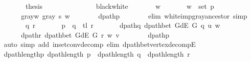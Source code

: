 \begin{isabellebody}
\ \ \ \ \isamarkupfalse%
\ \isamarkupfalse%
\ {\isacharquery}{\kern0pt}thesis\isanewline
\ \ \ \ \ \ \isacommand{{\isachardot}{\kern0pt}}\isamarkupfalse%
\isanewline
\ \ \isamarkupfalse%
\isanewline
\ \ \ \ \isamarkupfalse%
\ black{\isacharunderscore}{\kern0pt}white\isanewline
\ \ \ \ \isamarkupfalse%
\ \isamarkupfalse%
\ w\ \isanewline
\ \ \ \ \ \ {\isachardoublequoteopen}w\ {\isasymin}\ set\ p{\isachardoublequoteclose}\ \isanewline
\ \ \ \ \ \ gray{\isacharunderscore}{\kern0pt}w{\isacharcolon}{\kern0pt}\ {\isachardoublequoteopen}gray\ s\ w{\isachardoublequoteclose}\isanewline
\ \ \ \ \ \ \isamarkupfalse%
\ dpath{\isacharunderscore}{\kern0pt}p\isanewline
\ \ \ \ \ \ \isamarkupfalse%
\ {\isacharparenleft}{\kern0pt}elim\ white{\isacharunderscore}{\kern0pt}imp{\isacharunderscore}{\kern0pt}gray{\isacharunderscore}{\kern0pt}ancestor{\isacharparenright}{\kern0pt}\ simp{\isacharplus}{\kern0pt}\isanewline
\ \ \ \ \isamarkupfalse%
\ \isamarkupfalse%
\ q\ r\ \isanewline
\ \ \ \ \ \ {\isachardoublequoteopen}p\ {\isacharequal}{\kern0pt}\ q\ {\isacharat}{\kern0pt}\ tl\ r{\isachardoublequoteclose}\ \isanewline
\ \ \ \ \ \ dpath{\isacharunderscore}{\kern0pt}q{\isacharcolon}{\kern0pt}\ {\isachardoublequoteopen}dpath{\isacharunderscore}{\kern0pt}bet\ {\isacharparenleft}{\kern0pt}G{\isachardot}{\kern0pt}dE\ G{\isacharparenright}{\kern0pt}\ q\ u\ w{\isachardoublequoteclose}\ \isanewline
\ \ \ \ \ \ dpath{\isacharunderscore}{\kern0pt}r{\isacharcolon}{\kern0pt}\ {\isachardoublequoteopen}dpath{\isacharunderscore}{\kern0pt}bet\ {\isacharparenleft}{\kern0pt}G{\isachardot}{\kern0pt}dE\ G{\isacharparenright}{\kern0pt}\ r\ w\ v{\isachardoublequoteclose}\isanewline
\ \ \ \ \ \ \isamarkupfalse%
\ dpath{\isacharunderscore}{\kern0pt}p\isanewline
\ \ \ \ \ \ \isamarkupfalse%
\ {\isacharparenleft}{\kern0pt}auto\ simp\ add{\isacharcolon}{\kern0pt}\ in{\isacharunderscore}{\kern0pt}set{\isacharunderscore}{\kern0pt}conv{\isacharunderscore}{\kern0pt}decomp\ elim{\isacharcolon}{\kern0pt}\ dpath{\isacharunderscore}{\kern0pt}bet{\isacharunderscore}{\kern0pt}vertex{\isacharunderscore}{\kern0pt}decompE{\isacharparenright}{\kern0pt}\isanewline
\ \ \ \ \isamarkupfalse%
\ dpath{\isacharunderscore}{\kern0pt}length{\isacharunderscore}{\kern0pt}p{\isacharcolon}{\kern0pt}\ {\isachardoublequoteopen}dpath{\isacharunderscore}{\kern0pt}length\ p\ {\isacharequal}{\kern0pt}\ dpath{\isacharunderscore}{\kern0pt}length\ q\ {\isacharplus}{\kern0pt}\ dpath{\isacharunderscore}{\kern0pt}length\ r{\isachardoublequoteclose}\isanewline

\end{isabellebody}
